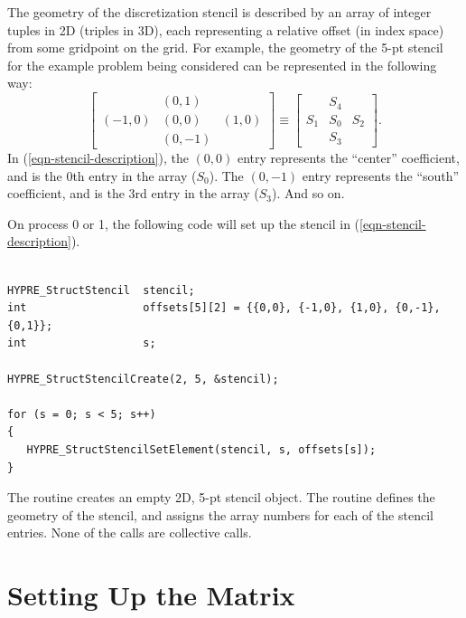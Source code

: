 The geometry of the discretization stencil is described by an array of
integer tuples in 2D (triples in 3D), each representing a relative
offset (in index space) from some gridpoint on the grid.  For example,
the geometry of the 5-pt stencil for the example problem being
considered can be represented in the following way:
\begin{equation}\label{eqn-stencil-description}
\left [
\begin{array}{ccc}
        & ( 0, 1) &         \\
(-1, 0) & ( 0, 0) & ( 1, 0) \\
        & ( 0,-1) &        
\end{array}
\right ]
\equiv
\left [
\begin{array}{ccc}
    & S_4 &     \\
S_1 & S_0 & S_2 \\
    & S_3 &    
\end{array}
\right ] .
\end{equation}
In (\ref{eqn-stencil-description}), the $(0,0)$ entry represents the
``center'' coefficient, and is the 0th entry in the array ($S_0$).
The $(0,-1)$ entry represents the ``south'' coefficient, and is the
3rd entry in the array ($S_3$).  And so on.

On process 0 or 1, the following code will set up the stencil in
(\ref{eqn-stencil-description}).
\begin{display}
\begin{verbatim}

HYPRE_StructStencil  stencil;
int                  offsets[5][2] = {{0,0}, {-1,0}, {1,0}, {0,-1}, {0,1}};
int                  s;

HYPRE_StructStencilCreate(2, 5, &stencil);

for (s = 0; s < 5; s++)
{
   HYPRE_StructStencilSetElement(stencil, s, offsets[s]);
}

\end{verbatim}
\end{display}
The  routine creates an empty 2D,
5-pt stencil object.  The 
routine defines the geometry of the stencil, and assigns the array
numbers for each of the stencil entries.  None of the calls are
collective calls.


\section{Setting Up the Matrix}
\label{Setting Up the Matrix}

